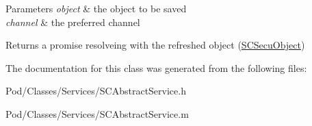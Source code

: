 \begin{DoxyParams}{Parameters}
{\em object} & the object to be saved \\
\hline
{\em channel} & the preferred channel\\
\hline
\end{DoxyParams}
\begin{DoxyReturn}{Returns}
a promise resolveing with the refreshed object (\hyperlink{interface_s_c_secu_object}{S\+C\+Secu\+Object}) 
\end{DoxyReturn}


The documentation for this class was generated from the following files\+:\begin{DoxyCompactItemize}
\item 
Pod/\+Classes/\+Services/S\+C\+Abstract\+Service.\+h\item 
Pod/\+Classes/\+Services/S\+C\+Abstract\+Service.\+m\end{DoxyCompactItemize}
